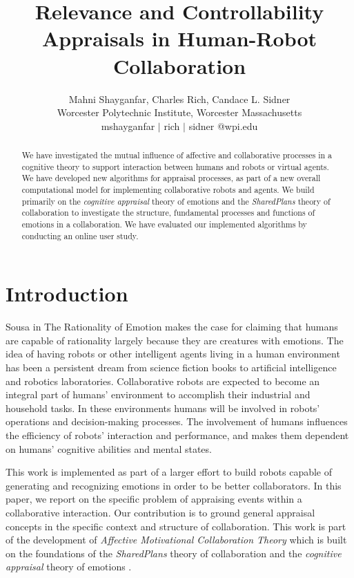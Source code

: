 \documentclass{article}
\title{Relevance and Controllability Appraisals in Human-Robot Collaboration}
\author{Mahni Shayganfar, Charles Rich, Candace L. Sidner \\ 
Worcester Polytechnic Institute, Worcester Massachusetts  \\
mshayganfar $|$ rich $|$ sidner @wpi.edu}
\begin{document}
\maketitle

\begin{abstract}
We have investigated the mutual influence of affective and collaborative
processes in a cognitive theory to support interaction between humans and robots
or virtual agents. We have developed new algorithms for appraisal processes, as
part of a new overall computational model for implementing collaborative robots
and agents. We build primarily on the \textit{cognitive appraisal} theory of
emotions and the \textit{SharedPlans} theory of collaboration to investigate the
structure, fundamental processes and functions of emotions in a collaboration.
We have evaluated our implemented algorithms by conducting an online user study.
\end{abstract}

\section{Introduction}

Sousa in The Rationality of Emotion \cite{sousa:rationality-emotion}
makes the case for claiming that humans are capable of rationality largely
because they are creatures with emotions. The idea of having robots or other
intelligent agents living in a human environment has been a persistent dream
from science fiction books to artificial intelligence and robotics laboratories.
Collaborative robots are expected to become an integral part of humans'
environment to accomplish their industrial and household tasks. In these
environments humans will be involved in robots' operations and decision-making
processes. The involvement of humans influences the efficiency of robots'
interaction and performance, and makes them dependent on humans' cognitive
abilities and mental states.

This work is implemented as part of a larger effort to build robots capable of
generating and recognizing emotions in order to be better collaborators. In this
paper, we report on the specific problem of appraising events within a
collaborative interaction. Our contribution is to ground general appraisal
concepts in the specific context and structure of collaboration. This work is
part of the development of \textit{Affective Motivational Collaboration Theory}
which is built on the foundations of the \textit{SharedPlans} theory of
collaboration \cite{grosz:plans-discourse} and the \textit{cognitive appraisal}
theory of emotions \cite{gratch:domain-independent}.
\end{document}
